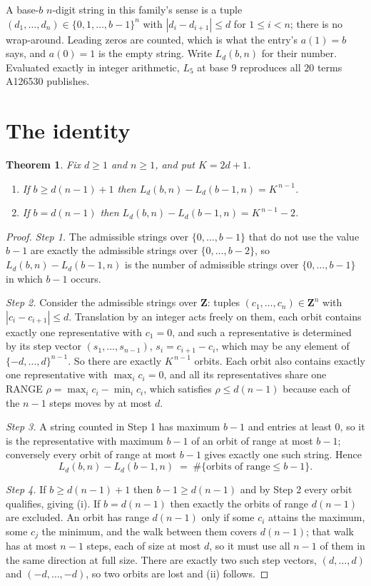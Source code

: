 \documentclass[11pt,a4paper]{article}
\theoremstyle{plain}
\newtheorem{theorem}{Theorem}
\theoremstyle{definition}
\begin{document}
A base-$b$ $n$-digit string in this family's sense is a tuple
$(d_1,\dots,d_n)\in\{0,1,\dots,b-1\}^{n}$ with $|d_i-d_{i+1}|\le d$ for $1\le i<n$; there
is no wrap-around. Leading zeros are counted, which is what the entry's $a(1)=b$ says, and
$a(0)=1$ is the empty string. Write $L_d(b,n)$ for their number. Evaluated exactly in integer
arithmetic, $L_{5}$ at base $9$ reproduces all $20$ terms A126530 publishes.

\section{The identity}

\begin{theorem}
Fix $d\ge1$ and $n\ge1$, and put $K=2d+1$.
\begin{enumerate}
\item[(i)] If $b\ge d(n-1)+1$ then $L_d(b,n)-L_d(b-1,n)=K^{\,n-1}$.
\item[(ii)] If $b=d(n-1)$ then $L_d(b,n)-L_d(b-1,n)=K^{\,n-1}-2$.
\end{enumerate}
\end{theorem}

\begin{proof}
\emph{Step 1.} The admissible strings over $\{0,\dots,b-1\}$ that do not use the value $b-1$
are exactly the admissible strings over $\{0,\dots,b-2\}$, so $L_d(b,n)-L_d(b-1,n)$ is the
number of admissible strings over $\{0,\dots,b-1\}$ in which $b-1$ occurs.

\emph{Step 2.} Consider the admissible strings over $\mathbf{Z}$: tuples
$(c_1,\dots,c_n)\in\mathbf{Z}^{n}$ with $|c_i-c_{i+1}|\le d$. Translation by an integer acts
freely on them, each orbit contains exactly one representative with $c_1=0$, and such a
representative is determined by its step vector $(s_1,\dots,s_{n-1})$, $s_i=c_{i+1}-c_i$,
which may be any element of $\{-d,\dots,d\}^{n-1}$. So there are exactly $K^{\,n-1}$ orbits.
Each orbit also contains exactly one representative with $\max_i c_i=0$, and all its
representatives share one RANGE $\rho=\max_ic_i-\min_ic_i$, which satisfies
$\rho\le d(n-1)$ because each of the $n-1$ steps moves by at most $d$.

\emph{Step 3.} A string counted in Step 1 has maximum $b-1$ and entries at least $0$, so it is
the representative with maximum $b-1$ of an orbit of range at most $b-1$; conversely every orbit
of range at most $b-1$ gives exactly one such string. Hence
\[
L_d(b,n)-L_d(b-1,n)\;=\;\#\{\text{orbits of range}\le b-1\} .
\]

\emph{Step 4.} If $b\ge d(n-1)+1$ then $b-1\ge d(n-1)$ and by Step 2 every orbit qualifies,
giving (i). If $b=d(n-1)$ then exactly the orbits of range $d(n-1)$ are excluded. An orbit has
range $d(n-1)$ only if some $c_i$ attains the maximum, some $c_j$ the minimum, and the walk
between them covers $d(n-1)$; that walk has at most $n-1$ steps, each of size at most $d$, so it
must use all $n-1$ of them in the same direction at full size. There are exactly two such step
vectors, $(d,\dots,d)$ and $(-d,\dots,-d)$, so two orbits are lost and (ii) follows.
\end{proof}
\end{document}
